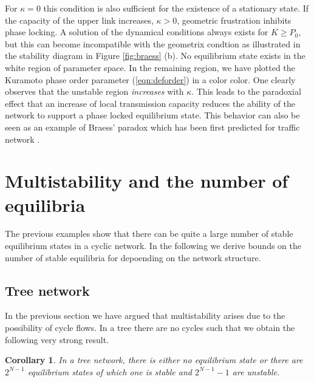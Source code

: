 \documentclass[10pt,aps,pre,preprint,superscriptaddress]{revtex4-1}
\newtheorem{corr}{Corollary}
\begin{document}
For $\kappa = 0$ this condition is also sufficient for
the existence of a stationary state. If the capacity of the
upper link increases, $\kappa > 0$, geometric frustration
inhibits phase locking. A solution of the dynamical conditions
always  exists for   $K \ge P_0$, but this can become 
incompatible with the geometrix condtion as illustrated 
in the stability diagram  in Figure \ref{fig:braess} (b). No equilibrium
state exists in the white region of parameter space. 
In the remaining region, we have plotted the Kuramoto phase 
order parameter (\ref{eqn:deforder})
in a color color.
One clearly observes that the unstable region \emph{increases} 
with $\kappa$. This leads to the paradoxial effect that
an increase of local transmission capacity reduces
the ability of the network to support a phase locked 
equilibrium state. This behavior can also be seen as an example of 
Braess' paradox which has been first predicted for traffic 
network \cite{Brae68,12braess}.
 

\section{Multistability and the number of equilibria}

The previous examples show that there can be quite a large
number of stable equilibrium states in a cyclic network. 
In the following we derive bounds on the number of stable 
equilibria for depoending on the network structure.

\subsection{Tree network}

In the previous section we have argued that multistability
arises due to the possibility of cycle flows. In a tree there
are no cycles such that we obtain the following very strong result.

\begin{corr}
\label{eqn:corr-tree}
In a tree network, there is either no equilibrium state
or there are $2^{N-1}$ equilibrium states of which
one is stable and $2^{N-1}-1$ are unstable.
\end{corr}
\end{document}
